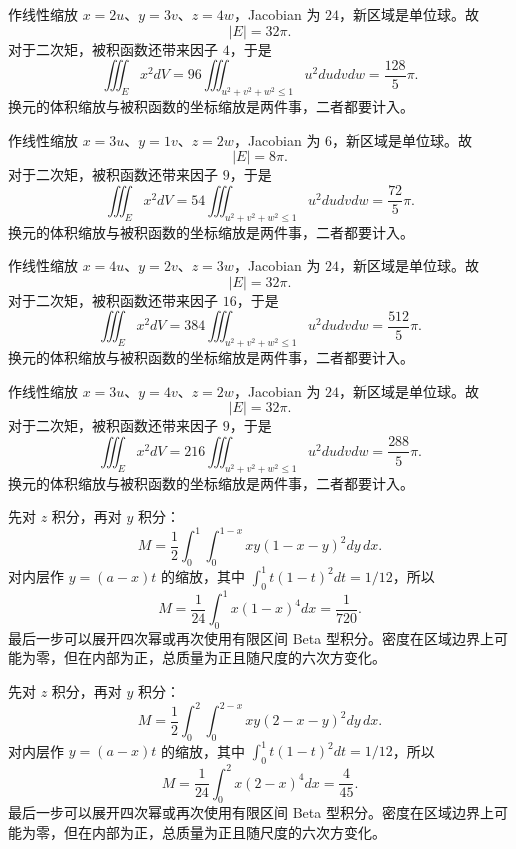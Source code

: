 \documentclass[UTF8,12pt,a4paper,fontset=fandol]{ctexart}
\begin{document}
\begin{solve}\label{ans:c39q15}
作线性缩放 $x=2u$、$y=3v$、$z=4w$，Jacobian 为 $24$，新区域是单位球。故
\[
|E|=32\pi.
\]
对于二次矩，被积函数还带来因子 $4$，于是
\[
\iiint_Ex^2dV=96\iiint_{u^2+v^2+w^2\le1}u^2dudvdw=\frac{128}{5}\pi.
\]
换元的体积缩放与被积函数的坐标缩放是两件事，二者都要计入。
\end{solve}

\begin{solve}\label{ans:c39q16}
作线性缩放 $x=3u$、$y=1v$、$z=2w$，Jacobian 为 $6$，新区域是单位球。故
\[
|E|=8\pi.
\]
对于二次矩，被积函数还带来因子 $9$，于是
\[
\iiint_Ex^2dV=54\iiint_{u^2+v^2+w^2\le1}u^2dudvdw=\frac{72}{5}\pi.
\]
换元的体积缩放与被积函数的坐标缩放是两件事，二者都要计入。
\end{solve}

\begin{solve}\label{ans:c39q17}
作线性缩放 $x=4u$、$y=2v$、$z=3w$，Jacobian 为 $24$，新区域是单位球。故
\[
|E|=32\pi.
\]
对于二次矩，被积函数还带来因子 $16$，于是
\[
\iiint_Ex^2dV=384\iiint_{u^2+v^2+w^2\le1}u^2dudvdw=\frac{512}{5}\pi.
\]
换元的体积缩放与被积函数的坐标缩放是两件事，二者都要计入。
\end{solve}

\begin{solve}\label{ans:c39q18}
作线性缩放 $x=3u$、$y=4v$、$z=2w$，Jacobian 为 $24$，新区域是单位球。故
\[
|E|=32\pi.
\]
对于二次矩，被积函数还带来因子 $9$，于是
\[
\iiint_Ex^2dV=216\iiint_{u^2+v^2+w^2\le1}u^2dudvdw=\frac{288}{5}\pi.
\]
换元的体积缩放与被积函数的坐标缩放是两件事，二者都要计入。
\end{solve}

\begin{solve}\label{ans:c39q19}
先对 $z$ 积分，再对 $y$ 积分：
\[
M=\frac12\int_0^{1}\int_0^{1-x}xy(1-x-y)^2dy\,dx.
\]
对内层作 $y=(a-x)t$ 的缩放，其中 $\int_0^1t(1-t)^2dt=1/12$，所以
\[
M=\frac1{24}\int_0^{1}x(1-x)^4dx=\frac{1}{720}.
\]
最后一步可以展开四次幂或再次使用有限区间 Beta 型积分。密度在区域边界上可能为零，但在内部为正，总质量为正且随尺度的六次方变化。
\end{solve}

\begin{solve}\label{ans:c39q20}
先对 $z$ 积分，再对 $y$ 积分：
\[
M=\frac12\int_0^{2}\int_0^{2-x}xy(2-x-y)^2dy\,dx.
\]
对内层作 $y=(a-x)t$ 的缩放，其中 $\int_0^1t(1-t)^2dt=1/12$，所以
\[
M=\frac1{24}\int_0^{2}x(2-x)^4dx=\frac{4}{45}.
\]
最后一步可以展开四次幂或再次使用有限区间 Beta 型积分。密度在区域边界上可能为零，但在内部为正，总质量为正且随尺度的六次方变化。
\end{solve}
\end{document}
